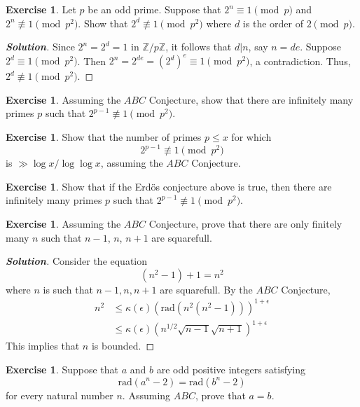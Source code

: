\documentclass[12pt,leqno]{book}
\numberwithin{equation}{section}
\theoremstyle{definition}
\newtheorem{exer}[thm]{Exercise}
\newenvironment{Solution}{\begin{proof}[\textnormal{\textbf{Solution}}]}{\end{proof}}
\begin{document}
\begin{exer}
 Let $p$ be an odd prime. Suppose that $2^n\equiv1\pmod{p}$ and $2^n\not\equiv1\pmod{p^2}$. Show that $2^d\not\equiv1\pmod{p^2}$ where $d$ is the order of $2\pmod{p}$.
\end{exer} 

\begin{Solution}
 Since $2^n=2^d=1$ in $\mathbb{Z}/p\mathbb{Z}$, it follows that $d|n$, say $n=de$. Suppose $2^d\equiv1\pmod{p^2}$. Then $2^n=2^{de}=(2^d)^e\equiv1\pmod{p^2}$, a contradiction. Thus, $2^d\not\equiv1\pmod{p^2}$. 
\end{Solution}

\begin{exer}
 Assuming the $ABC$ Conjecture, show that there are infinitely many primes $p$ such that $2^{p-1}\not\equiv1\pmod{p^2}$. 
\end{exer}

\begin{exer}
 Show that the number of primes $p\leq x$ for which \[2^{p-1}\not\equiv1\pmod{p^2}\] is $\gg\log x/\log\log x$, assuming the $ABC$ Conjecture.
\end{exer}

\begin{exer}
 Show that if the Erd\"{o}s conjecture above is true, then there are infinitely many primes $p$ such that $2^{p-1}\not\equiv1\pmod{p^2}$.
\end{exer}

\begin{exer}
 Assuming the $ABC$ Conjecture, prove that there are only finitely many $n$ such that $n-1$, $n$, $n+1$ are squarefull.
\end{exer}

\begin{Solution}
 Consider the equation\[(n^2-1)+1=n^2\] where $n$ is such that $n-1,n,n+1$ are squarefull. By the $ABC$ Conjecture, \begin{align*}n^2&\leq \kappa(\epsilon)\left(\text{rad}\left(n^2(n^2-1)\right)\right)^{1+\epsilon}\\&\leq\kappa(\epsilon)\left(n^{1/2}\sqrt{n-1}\sqrt{n+1}\right)^{1+\epsilon}\end{align*} This implies that $n$ is bounded.
\end{Solution}

\begin{exer}
 Suppose that $a$ and $b$ are odd positive integers satisfying \[\text{rad}(a^n-2)=\text{rad}(b^n-2)\] for every natural number $n$. Assuming $ABC$, prove that $a=b$.
\end{exer}
\end{document}

